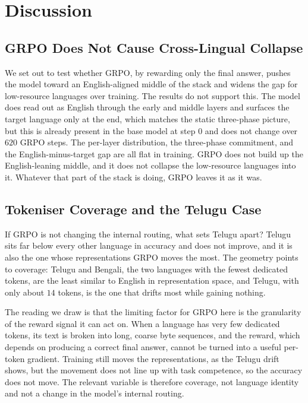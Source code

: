 \section{Discussion}
\label{sec:grpo-discussion}

\subsection{GRPO Does Not Cause Cross-Lingual Collapse}
\label{subsec:grpo-no-collapse}

We set out to test whether GRPO, by rewarding only the final answer, pushes the model
toward an English-aligned middle of the stack and widens the gap for low-resource
languages over training. The results do not support this. The model does read out as
English through the early and middle layers and surfaces the target language only at
the end, which matches the static three-phase picture, but this is already present in
the base model at step $0$ and does not change over $620$ GRPO steps. The per-layer
distribution, the three-phase commitment, and the English-minus-target gap are all
flat in training. GRPO does not build up the English-leaning middle, and it does not
collapse the low-resource languages into it. Whatever that part of the stack is doing,
GRPO leaves it as it was.

\subsection{Tokeniser Coverage and the Telugu Case}
\label{subsec:grpo-coverage-discussion}

If GRPO is not changing the internal routing, what sets Telugu apart? Telugu sits far
below every other language in accuracy and does not improve, and it is also the one
whose representations GRPO moves the most. The geometry points to coverage: Telugu and
Bengali, the two languages with the fewest dedicated tokens, are the least similar to
English in representation space, and Telugu, with only about $14$ tokens, is the one
that drifts most while gaining nothing.

The reading we draw is that the limiting factor for GRPO here is the granularity of
the reward signal it can act on. When a language has very few dedicated tokens, its
text is broken into long, coarse byte sequences, and the reward, which depends on
producing a correct final answer, cannot be turned into a useful per-token gradient.
Training still moves the representations, as the Telugu drift shows, but the movement
does not line up with task competence, so the accuracy does not move. The relevant
variable is therefore coverage, not language identity and not a change in the model's
internal routing.


